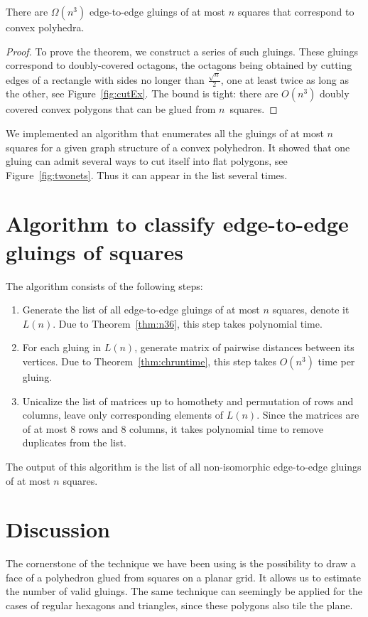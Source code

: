 \documentclass[a4paper,USenglish,cleveref, autoref, thm-restate]{socg-lipics-v2019}
\begin{document}


\begin{theorem} \label{thm:n52}
	There are $\Omega \left( n^3 \right)$ edge-to-edge gluings of at most $n$ squares that correspond to convex polyhedra.
\end{theorem}

\begin{proof}
	To prove the theorem, we construct a series of such gluings. These gluings correspond to doubly-covered octagons, the octagons being obtained by cutting edges of a rectangle with sides no longer than $\frac{\sqrt{n}}{2}$, one at least twice as long as the other, see Figure~\ref{fig:cutEx}. The bound is tight: there are $O(n^3)$ doubly covered convex polygons that can be glued from $n$~squares.
\end{proof}



We implemented an algorithm that enumerates all the gluings of at most $n$ squares for a given graph structure of a convex polyhedron. It showed that one gluing can admit several ways to cut itself into flat polygons, see Figure~\ref{fig:twonets}. Thus it can appear in the list several times.



\section{Algorithm to classify edge-to-edge gluings of squares}

The algorithm consists of the following steps:

\begin{enumerate}
	\item Generate the list of all edge-to-edge gluings of at most $n$ squares,
	denote it $L(n)$. Due to Theorem~\ref{thm:n36}, this step takes polynomial time.
	\item For each gluing in $L(n)$, generate matrix of pairwise distances
	between its vertices. Due to Theorem~\ref{thm:chruntime},
	this step takes $O(n^3)$ time per gluing.
	\item Unicalize the list of matrices up to homothety and permutation of rows and columns, leave only corresponding elements of $L(n)$. Since the matrices are of at most 8 rows and 8 columns, it takes polynomial time to remove duplicates from the list.
\end{enumerate}

The output of this algorithm is the list of all non-isomorphic edge-to-edge gluings of at most $n$ squares.

\section{Discussion}

The cornerstone of the technique we have been using is the possibility to draw a face of a polyhedron glued from squares on a planar grid. It allows us to estimate the number of valid gluings. The same technique can seemingly be applied for the cases of regular hexagons and triangles, since these polygons also tile the plane.


\end{document}
